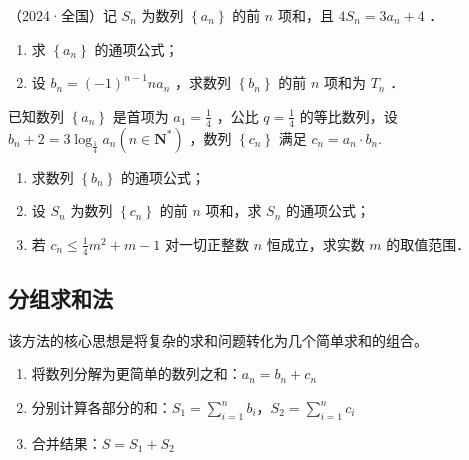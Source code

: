\vspace{10em}

\begin{example}
    （2024·全国）记 $S_n$ 为数列 $\left\{a_n\right\}$ 的前 $n$ 项和，且 $4 S_n=3 a_n+4$ ．
    \begin{enumerate}
        \item 求 $\left\{a_n\right\}$ 的通项公式；

        \item 设 $b_n=(-1)^{n-1} n a_n$ ，求数列 $\left\{b_n\right\}$ 的前 $n$ 项和为 $T_n$ ．
    \end{enumerate}
\end{example}

\vspace{10em}

\begin{example}
    已知数列 $\left\{a_n\right\}$ 是首项为 $a_1=\frac{1}{4}$ ，公比 $q=\frac{1}{4}$ 的等比数列，设 $b_n+2=3 \log _{\frac{1}{4}} a_n\left(n \in \mathbf{N}^*\right)$ ，数列 $\left\{c_n\right\}$ 满足 $c_n=a_n \cdot b_n$.
    \begin{enumerate}
        \item 求数列 $\left\{b_n\right\}$ 的通项公式；
        \item 设 $S_n$ 为数列 $\left\{c_n\right\}$ 的前 $n$ 项和，求 $S_n$ 的通项公式；
        \item 若 $c_n \leq \frac{1}{4} m^2+m-1$ 对一切正整数 $n$ 恒成立，求实数 $m$ 的取值范围．
    \end{enumerate}
\end{example}

\vspace{10em}

\subsection{分组求和法}

\begin{definition}[分组求和法]
    该方法的核心思想是将复杂的求和问题转化为几个简单求和的组合。
\end{definition}

\begin{theorem}[分组求和法]
    \begin{enumerate}
        \item 将数列分解为更简单的数列之和：$a_n = b_n + c_n$
        \item 分别计算各部分的和：$S_1 = \sum_{i=1}^n b_i$，$S_2 = \sum_{i=1}^n c_i$
        \item 合并结果：$S = S_1 + S_2$
    \end{enumerate}
\end{theorem}

